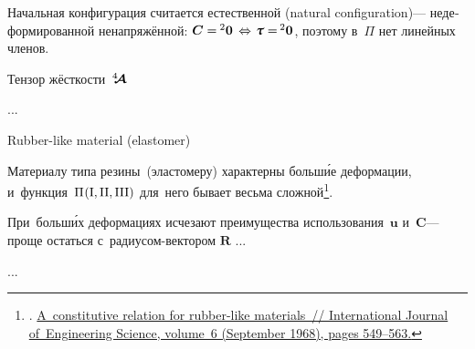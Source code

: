 \begin{otherlanguage}{russian}

\noindent Начальная конфигурация считается естественной (natural configuration)\:--- недеформированной ненапряжённой: ${\bm{C} = \hspace{-0.1ex} {^2\bm{0}} \hspace{.4ex} \Leftrightarrow \hspace{.2ex} \cauchystress = \hspace{-0.2ex} {^2\bm{0}}}$, поэтому в~$\Pi$ нет линейных членов.

Тензор жёсткости~$\hspace{.08ex}{^4\hspace{-0.72ex}\bm{\mathcal{A}}}\hspace{.08ex}$

...

Rubber\hbox{-}like material (elastomer)

Материалу типа резины~(эластомеру) характерны больш\'{и}е деформации, и~функция~${\Pi\hspace{.12ex}(\mathrm{I}, \mathrm{II}, \mathrm{III})}$ для~него бывает весьма сложной\footnote{. \href{https://kundoc.com/pdf-a-constitutive-relation-for-rubber-like-materials-.html}{A~constitutive relation for rubber-like ma\-te\-ri\-als~// International Journal of~Engineering Science, volume~6 (September 1968), pages 549\hbox{--}563.}}\hbox{\hspace{-0.5ex}.}

При~больш\'{и}х деформациях исчезают преимущества использования~$\bm{u}$ и~$\bm{C}$\:--- проще остаться с~радиусом\hbox{-}вектором $\bm{R}$ ...

...



\end{otherlanguage}

\newpage



\label{para:piolakirchhoffstresstensor}

